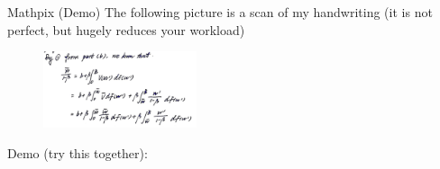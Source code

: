 \begin{frame}{Mathpix (Demo)}
The following picture is a scan of my handwriting (it is not perfect, but hugely reduces your workload)
\begin{figure}[h!]
 \centering
 \includegraphics[width=0.4\textwidth]{img/mathpixdemo.png}\\
 \label{fig:placeholder}
\end{figure}
Demo (try this together): 

\end{frame}